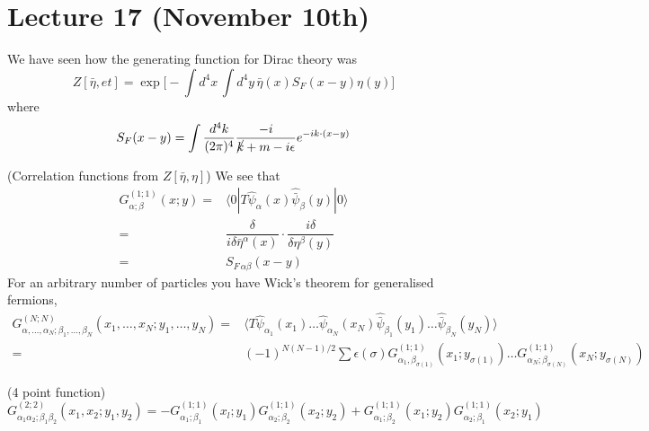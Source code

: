 \section{Lecture 17 (November 10th)}
\begin{rmk}
We have seen how the generating function for Dirac theory was
\[Z[\bar{\eta },et]=\exp \Big[-\int d^{4}x\,\int d^{4}y\,\bar{\eta }(x)S_{F}(x-y)\eta (y)\Big]\]
where
\[S_{F}(x-y)=\int \dfrac{d^{4}k}{(2\pi )^{4}}\dfrac{-i}{\cancel{k}+m-i\epsilon }e^{-ik\cdot (x-y)}\]
\end{rmk}
\vspace{2ex}
\begin{thm}
(Correlation functions from $Z[\bar{\eta },\eta ]$) We see that
\[\begin{align*}
G^{(1;1)}_{\alpha ;\beta }(x;y)=&\langle 0|T\hat{\psi }_{\alpha }(x)\hat{\bar{\psi }}_{\beta }(y)|0\rangle \\
=&\dfrac{\delta }{i\delta \bar{\eta }^{\alpha }(x)}\cdot \dfrac{i\delta }{\delta \eta ^{\beta }(y)}\\
=&S_{F\,\alpha \beta }(x-y)
\end{align*}\]
For an arbitrary number of particles you have Wick's theorem for generalised fermions, 
\[\begin{align*}
G^{(N;N)}_{\alpha ,\ldots ,\alpha _{N};\beta _{1},\ldots ,\beta _{N}}(x_1,\ldots ,x_{N};y_{1},\ldots ,y_{N})=&\langle T\hat{\psi }_{\alpha_1}(x_1)\ldots \hat{\psi }_{\alpha _{N}}(x_{N})\hat{\bar{\psi }}_{\beta_1}(y_1)\ldots \hat{\bar{\psi }}_{\beta _{N}}(y_{N})\rangle \\
=&(-1)^{N(N-1)/2}\sum \epsilon (\sigma )G^{(1;1)}_{\alpha_1,\beta _{\sigma (1)}}(x_1;y_{\sigma (1)})\ldots G^{(1;1)}_{\alpha _{N};\beta _{\sigma (N)}}(x_{N};y_{\sigma (N)})
\end{align*}\]
\end{thm}
\vspace{2ex}
\begin{ex}
(4 point function) 
\[G^{(2;2)}_{\alpha_1\alpha_2;\beta_1\beta_2}(x_1,x_2;y_1,y_2)=-G^{(1;1)}_{\alpha_1;\beta_1}(x_l;y_1)G^{(1;1)}_{\alpha_2;\beta_2}(x_2;y_2)+G^{(1;1)}_{\alpha_1;\beta_2}(x_1;y_2)G^{(1;1)}_{\alpha_2;\beta_1}(x_2;y_1)\]
\end{ex}
\vspace{2ex}
